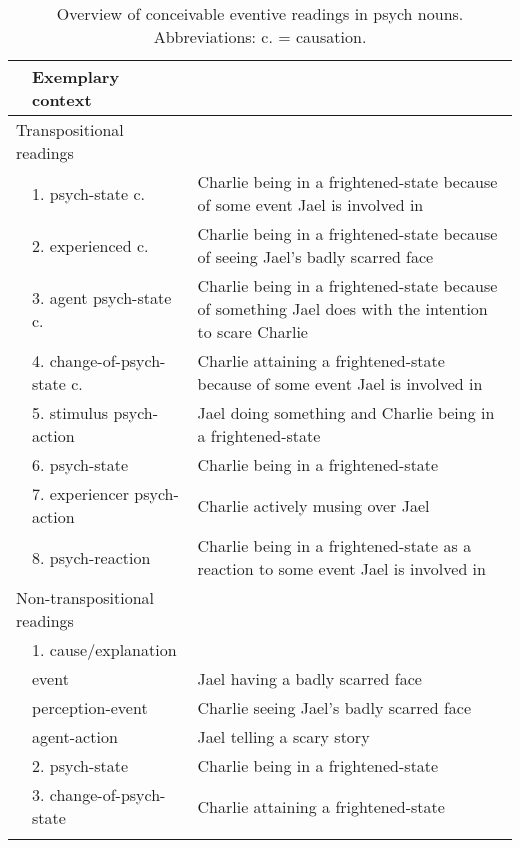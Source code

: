 \begin{table}
	\caption[Overview of conceivable eventive readings in psych nouns]{Overview of conceivable eventive readings in psych nouns. Abbreviations: c. = causation.} 
	\label{tab:eventivepsych}
	\begin{tabular}{ll>{\RaggedRight\arraybackslash}p{}}
		\lsptoprule
		\multicolumn{2}{l}{Reading} & Exemplary context\\
		\midrule
		\multicolumn{2}{l}{Transpositional readings} & \\
		& 1. psych-state c. & Charlie being in a frightened-state because of some event Jael is involved in\\
		& 2.  experienced c. & Charlie being in a frightened-state because of seeing Jael's badly scarred face\\
		& 3.  agent psych-state c. & Charlie being in a frightened-state because of something Jael does with the intention to scare Charlie\\
		& 4.  change-of-psych-state c. & Charlie attaining a frightened-state because of some event Jael is involved in\\
		& 5. stimulus psych-action & Jael doing something and Charlie being in a frightened-state\\
		& 6. psych-state & Charlie being in a frightened-state \\
		& 7. experiencer psych-action & Charlie actively musing over Jael \\
		& 8. psych-reaction & Charlie being in a frightened-state as a reaction to some event Jael is involved in\\
		\multicolumn{2}{l}{Non-transpositional readings} & \\
		& 1. cause/explanation & \\
		& \enspace \textendash{} event & Jael having a badly scarred face\\
		& \enspace \textendash{} perception-event & Charlie seeing Jael's badly scarred face\\
		& \enspace \textendash{} agent-action & Jael telling a scary story \\
		& 2. psych-state & Charlie being in a frightened-state \\
		& 3. change-of-psych-state & Charlie attaining a frightened-state \\
		\lspbottomrule
	\end{tabular}
\end{table} 

